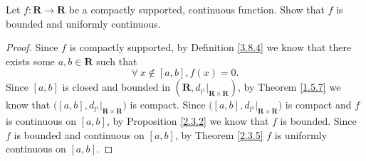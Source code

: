 \begin{exercise}\label{ex 3.8.3}
    Let \(f : \mathbf{R} \to \mathbf{R}\) be a compactly supported, continuous function.
    Show that \(f\) is bounded and uniformly continuous.
\end{exercise}

\begin{proof}
    Since \(f\) is compactly supported, by Definition \ref{3.8.4} we know that there exists some \(a, b \in \mathbf{R}\) such that
    \[
        \forall\ x \notin [a, b], f(x) = 0.
    \]
    Since \([a, b]\) is closed and bounded in \((\mathbf{R}, d_{l^1}|_{\mathbf{R} \times \mathbf{R}})\), by Theorem \ref{1.5.7} we know that \(\big([a, b], d_{l^1}|_{\mathbf{R} \times \mathbf{R}}\big)\) is compact.
    Since \(\big([a, b], d_{l^1}|_{\mathbf{R} \times \mathbf{R}}\big)\) is compact and \(f\) is continuous on \([a, b]\), by Proposition \ref{2.3.2} we know that \(f\) is bounded.
    Since \(f\) is bounded and continuous on \([a, b]\), by Theorem \ref{2.3.5} \(f\) is uniformly continuous on \([a, b]\).


\end{proof}
